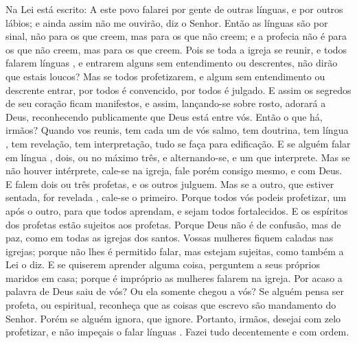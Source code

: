 {  Na Lei está escrito: A este povo falarei por gente de outras línguas, e por outros lábios; e ainda assim não me ouvirão, diz o Senhor.
  Então as línguas
{} são por sinal, não para os que creem, mas para os que não creem; e a profecia não é para os que não creem, mas para os que creem.
  Pois se toda a igreja se reunir, e todos falarem línguas
{},  e entrarem alguns sem entendimento ou descrentes, não dirão que estais loucos?
  Mas se todos profetizarem, e algum sem entendimento ou descrente entrar, por todos é convencido,
{} por todos é julgado.
  E assim os segredos de seu coração ficam manifestos, e assim, lançando-se sobre
{} rosto, adorará a Deus, reconhecendo publicamente que Deus está entre vós.
  Então o que há, irmãos? Quando vos reunis, tem cada um de vós salmo, tem doutrina, tem língua
{},  tem revelação, tem interpretação, tudo se faça para edificação.
  E se alguém falar em língua
{}, 
{} dois, ou no máximo três, e alternando-se, e um que interprete.
  Mas se não houver intérprete, cale-se na igreja, fale porém consigo mesmo, e com Deus.
  E falem dois ou três profetas, e os outros julguem.
  Mas se a outro, que estiver sentada, for revelada
{},  cale-se o primeiro.
  Porque todos vós podeis profetizar, um após o outro, para que todos aprendam, e sejam todos fortalecidos.
  E os espíritos dos profetas estão sujeitos aos profetas.
  Porque Deus não é de confusão, mas de paz, como em todas as igrejas dos santos.
  Vossas mulheres fiquem caladas nas igrejas; porque não lhes é permitido falar, mas
{} estejam sujeitas, como também a Lei o diz.
  E se quiserem aprender alguma coisa, perguntem a seus próprios maridos em casa; porque é impróprio as mulheres falarem na igreja.
  Por acaso a palavra de Deus saiu de vós? Ou ela somente chegou a vós?
  Se alguém pensa ser profeta, ou espiritual, reconheça que as coisas que escrevo são mandamento do Senhor.
  Porém se alguém ignora, que ignore.
  Portanto, irmãos, desejai com zelo profetizar, e não impeçais o falar línguas
{} .
  Fazei tudo decentemente e com ordem.
\par }

